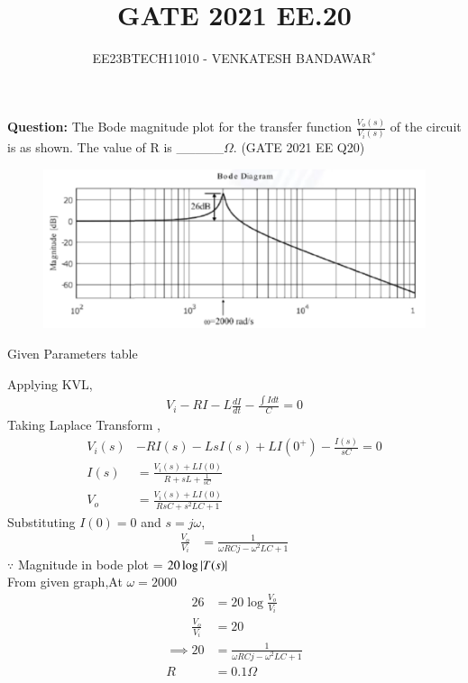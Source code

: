 \documentclass[journal,12pt,twocolumn]{IEEEtran}
\theoremstyle{remark}
\begin{document}

\vspace{3cm}

\title{GATE 2021 EE.20}
\author{EE23BTECH11010 - VENKATESH BANDAWAR$^{*}$%
}
\maketitle
\newpage
\bigskip
\textbf{Question:} The Bode magnitude plot for the transfer function $\frac{V_o(s)}{V_i(s)}$ of the circuit is as shown. The value of R is \_\_\_\_\_$\Omega$. \hfill(GATE 2021 EE Q20)
\begin{figure}[!ht]
    \centering
    
\end{figure}
\begin{figure}[!ht]
    \centering
    \includegraphics[width=\columnwidth]{figs/bode.png}
\end{figure}
\solution
\begin{table}[!ht]
    \centering
    
    \caption{Given Parameters table}
    \label{Given Parameters table_2021_EE_20}
\end{table}
Applying KVL,
\begin{align}
    V_i - R I - L\frac{dI}{dt} - \frac{\int I dt}{C} = 0
\end{align}
Taking Laplace Transform ,
\begin{align}
    V_i(s) &- RI(s) - LsI(s) + LI(0^+) - \frac{I(s)}{sC} = 0\\
    I(s) &= \frac{V_i(s) + LI(0)}{R + sL + \frac{1}{sC}}\\
    V_o &= \frac{V_i(s) + LI(0)}{RsC + s^2LC + 1}
\end{align}
Substituting $I(0) = 0$ and $s = j\omega$,
\begin{align}
    \frac{V_o}{V_i} &= \frac{1}{\omega RCj -\omega^2LC + 1} 
\end{align}
$\because$ Magnitude in bode plot = $20\log \left\vert T(s)\right\vert$\\
From given graph,At $\omega = 2000$
\begin{align}
    26 &= 20 \log \frac{V_o}{V_i}\\
    \frac{V_o}{V_i} &= 20
\end{align}
\begin{align}
    \implies 20 &= \frac{1}{\omega RCj -\omega^2LC + 1} \\
    R &= 0.1 \Omega
\end{align}
\end{document}
